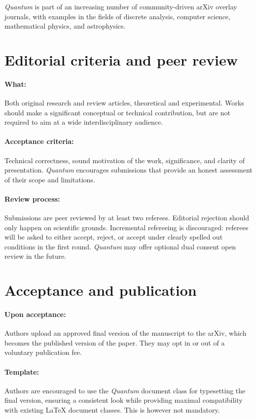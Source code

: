 \documentclass[12pt]{quantumarticle}
\begin{document}
\textit{Quantum} is part of an increasing number of community-driven arXiv overlay journals, with examples in the fields of discrete analysis, computer science, mathematical physics, and astrophysics.


\section{Editorial criteria and peer review}
\paragraph{What:} Both original research and review articles, theoretical and experimental. Works should make a significant conceptual or technical contribution, but are not required to aim at a wide interdisciplinary audience.

\paragraph{Acceptance criteria:} Technical correctness, sound motivation of the work, significance, and clarity of presentation.  \textit{Quantum} encourages submissions that provide an honest assessment of their scope and limitations.

\paragraph{Review process:} Submissions are peer reviewed by at least two referees. Editorial rejection should only happen on scientific grounds. Incremental refereeing is discouraged: referees will be asked to either accept, reject, or accept under clearly spelled out conditions in the first round. \textit{Quantum} may offer optional dual consent open review in the future.

\section{Acceptance and publication}
\paragraph{Upon acceptance:} Authors upload an approved final version of the manuscript to the arXiv, which becomes the published version of the paper. They may opt in or out of a voluntary publication fee.

\paragraph{Template:} Authors are encouraged to use the \textit{Quantum} document class for typesetting the final version, ensuring a consistent look while providing maximal compatibility with existing LaTeX document classes. This is however not mandatory.
\end{document}
